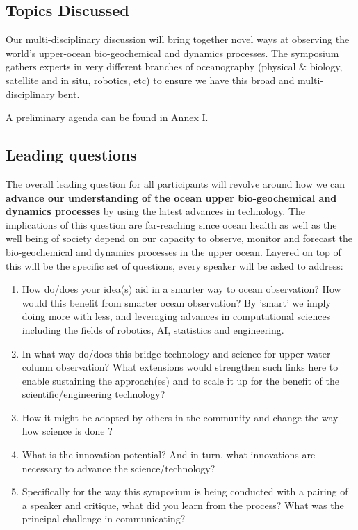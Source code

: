 \subsection{Topics Discussed}

Our multi-disciplinary discussion will bring together novel ways at
observing the world’s upper-ocean bio-geochemical and dynamics
processes. The symposium gathers experts in very different branches of
oceanography (physical \& biology, satellite and in situ, robotics, etc)
to ensure we have this broad and multi-disciplinary bent.

A preliminary agenda can be found in Annex I.

\subsection{Leading questions}

The overall leading question for all participants will revolve around
how we can \textbf{advance our understanding of the ocean upper
  bio-geochemical and dynamics processes} by using the latest advances
in technology. The implications of this question are far-reaching since
ocean health as well as the well being of society depend on our capacity
to observe, monitor and forecast the bio-geochemical and dynamics
processes in the upper ocean. Layered on top of this will be the
specific set of questions, every speaker will be asked to address:

\begin{enumerate}

\item How do/does your idea(s) aid in a smarter way to ocean
  observation? How would this benefit from smarter ocean observation? By
  'smart' we imply doing more with less, and leveraging advances in
  computational sciences including the fields of robotics, AI,
  statistics and engineering.

\item In what way do/does this bridge technology and science for upper
  water column observation? What extensions would strengthen such links
  here to enable sustaining the approach(es) and to scale it up for the
  benefit of the scientific/engineering technology?

\item How it might be adopted by others in the community and change the
  way how science is done ?

\item What is the innovation potential? And in turn, what innovations
  are necessary to advance the science/technology?

\item Specifically for the way this symposium is being conducted with a
  pairing of a speaker and critique, what did you learn from the
  process? What was the principal challenge in communicating?

\end{enumerate}

